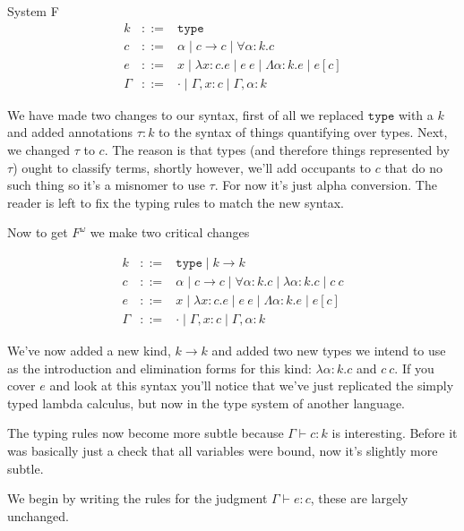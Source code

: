 \documentclass{amsart}
\newcommand{\type}{\ensuremath{\mathtt{type}}}
\begin{document}
\begin{section}{System F}
\[
\begin{array}{lcl}
  k & ::= & \type\\
  c & ::= & \alpha \mid c \to c \mid \forall \alpha : k. c\\
  e & ::= & x \mid \lambda x : c. e \mid e\ e \mid
            \Lambda \alpha : k. e \mid e[c]\\
  \Gamma & ::= & \cdot \mid \Gamma, x : c \mid \Gamma, \alpha : k
\end{array}
\]

We have made two changes to our syntax, first of all we replaced \type
with a $k$ and added annotations $\tau : k$ to the syntax of things
quantifying over types. Next, we changed $\tau$ to $c$. The reason is
that types (and therefore things represented by $\tau$) ought to
classify terms, shortly however, we'll add occupants to $c$ that do no
such thing so it's a misnomer to use $\tau$. For now it's just alpha
conversion. The reader is left to fix the typing rules to match the
new syntax.

Now to get $F^\omega$ we make two critical changes

\[
\begin{array}{lcl}
  k & ::= & \type \mid k \to k\\
  c & ::= & \alpha \mid c \to c \mid \forall \alpha : k. c
            \mid \lambda \alpha : k. c \mid c\ c\\
  e & ::= & x \mid \lambda x : c. e \mid e\ e \mid
            \Lambda \alpha : k. e \mid e[c]\\
  \Gamma & ::= & \cdot \mid \Gamma, x : c \mid \Gamma, \alpha : k
\end{array}
\]

We've now added a new kind, $k \to k$ and added two new types we
intend to use as the introduction and elimination forms for this
kind: $\lambda \alpha : k. c$ and $c\ c$. If you cover $e$ and look at
this syntax you'll notice that we've just replicated the simply typed
lambda calculus, but now in the type system of another language.

The typing rules now become more subtle because $\Gamma \vdash c : k$
is interesting. Before it was basically just a check that all
variables were bound, now it's slightly more subtle.

We begin by writing the rules for the judgment $\Gamma \vdash e : c$,
these are largely unchanged.


\end{section}
\end{document}
